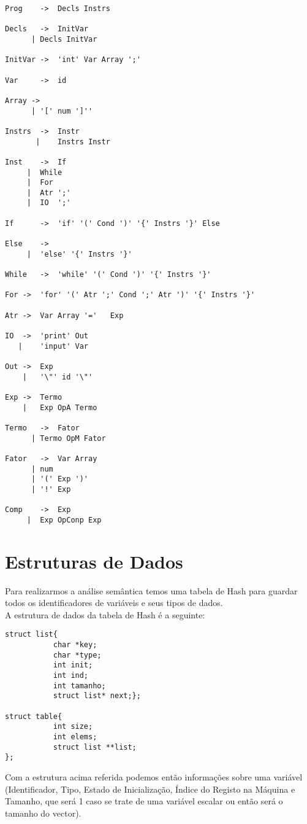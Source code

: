 \documentclass{report}
\begin{document}
\begin{verbatim}
Prog	->	Decls Instrs

Decls	->	InitVar
      |	Decls InitVar
		
InitVar	->	'int' Var Array ';'
		
Var		->	id

Array ->
      |	'[' num ']''

Instrs	->	Instr
       |	Instrs Instr
		
Inst	->	If
     |	While
     |	For
     |	Atr	';'
     |	IO	';'
		
If		->	'if' '(' Cond ')' '{' Instrs '}' Else

Else	->
     |	'else' '{' Instrs '}'
		
While 	-> 	'while' '(' Cond ')' '{' Instrs '}'

For	->	'for' '(' Atr ';' Cond ';' Atr ')' '{' Instrs '}'

Atr	->	Var Array '='	Exp
		
IO	->	'print' Out
   |	'input' Var
	
Out	->	Exp
    |	'\"' id '\"'

Exp	->	Termo
    |	Exp OpA	Termo
		
Termo	->	Fator
      |	Termo OpM Fator
		
Fator	->	Var Array
      |	num
      |	'(' Exp ')'
      |	'!' Exp
		
Comp	->	Exp
     |	Exp OpConp Exp
\end{verbatim}

\section{Estruturas de Dados}
Para realizarmos a análise semântica temos uma tabela de Hash para guardar todos os identificadores de variáveis e seus tipos de dados. \\A estrutura de dados da tabela de Hash é a seguinte:\\
\begin{verbatim}
struct list{
           char *key;
           char *type;
           int init;
           int ind;
           int tamanho;
           struct list* next;};

struct table{
           int size;
           int elems;
           struct list **list;
};
\end{verbatim}
Com a estrutura acima referida podemos então informações sobre uma variável (Identificador, Tipo, Estado de Inicialização, Índice do Registo na Máquina e Tamanho, que será 1 caso se trate de uma variável escalar ou então será o tamanho do vector).
\end{document}

